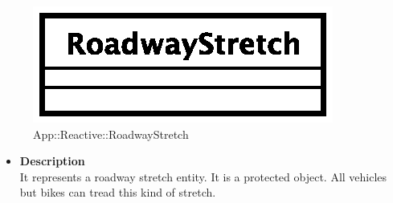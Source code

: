 \begin{figure}[h]
\centering
\includegraphics[scale=0.6,keepaspectratio]{images/solution/roadway_stretch.eps}
\caption{App::Reactive::RoadwayStretch}
\label{fig:sd-app-roadway_stretch}
\end{figure}
\FloatBarrier
\begin{itemize}
  \item \textbf{Description} \\
    It represents a roadway stretch entity. It is a protected object. All
    vehicles but bikes can tread this kind of stretch.
\end{itemize}

